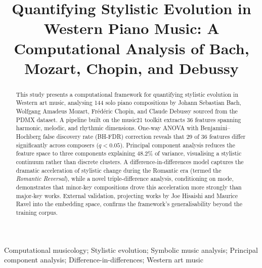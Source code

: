 \documentclass[]{interact}
\newif\ifblindreview
\theoremstyle{plain}
\theoremstyle{definition}
\theoremstyle{remark}
\begin{document}

\ifblindreview
  \title{Quantifying Stylistic Evolution in Western Piano Music: A Computational Analysis of Bach, Mozart, Chopin, and Debussy}
  \maketitle
  \author{\name{[Redacted for blind review]}\affil{[Redacted]}}
\else
  \title{Quantifying Stylistic Evolution in Western Piano Music: A Computational Analysis of Bach, Mozart, Chopin, and Debussy}
  \author{
  }
  \maketitle
\fi

\begin{abstract}
This study presents a computational framework for quantifying stylistic evolution in Western art music, analysing 144 solo piano compositions by Johann Sebastian Bach, Wolfgang Amadeus Mozart, Fr\'ed\'eric Chopin, and Claude Debussy sourced from the PDMX dataset. A pipeline built on the music21 toolkit extracts 36 features spanning harmonic, melodic, and rhythmic dimensions. One-way ANOVA with Benjamini--Hochberg false discovery rate (BH-FDR) correction reveals that 29 of 36 features differ significantly across composers ($q < 0.05$). Principal component analysis reduces the feature space to three components explaining 48.2\% of variance, visualising a stylistic continuum rather than discrete clusters. A difference-in-differences model captures the dramatic acceleration of stylistic change during the Romantic era (termed the \emph{Romantic Reversal}), while a novel triple-difference analysis, conditioning on mode, demonstrates that minor-key compositions drove this acceleration more strongly than major-key works. External validation, projecting works by Joe Hisaishi and Maurice Ravel into the embedding space, confirms the framework's generalisability beyond the training corpus.
\end{abstract}

\begin{keywords}
Computational musicology; Stylistic evolution; Symbolic music analysis; Principal component analysis; Difference-in-differences; Western art music
\end{keywords}
\end{document}
